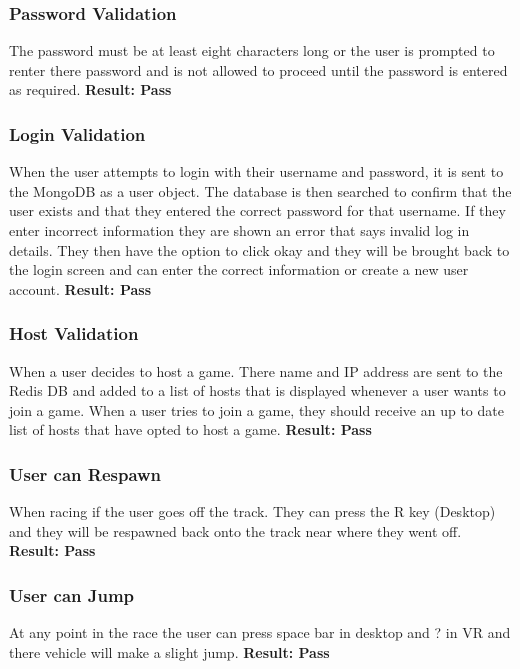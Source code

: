\subsubsection{Password Validation}  \newline
The password must be at least eight characters long or the user is prompted to renter  there password and is not allowed to proceed until the password is entered as required.\newline
\textbf{Result: Pass}

\subsubsection{Login Validation}  \newline
When the user attempts to login with their username and password, it is sent to the MongoDB as a user object. The database is then searched to confirm that the user exists and that they entered the correct password for that username. If they enter incorrect information they are shown an error that says invalid log in details. They then have the option to click okay and they will be brought back to the login screen and can enter the correct information or create a new user account.\newline 
\textbf{Result: Pass}

\subsubsection{Host Validation}\newline
When a user decides to host a game. There name and IP address are sent to the Redis DB and added to a list of hosts that is displayed whenever a user wants to join a game. When a user tries to join a game, they should receive an up to date list of hosts that have opted to host a game.\newline
\textbf{Result: Pass}

\subsubsection{User can Respawn}\newline
When racing if the user goes off the track. They can press the R key (Desktop) and they will be respawned back onto the track near where they went off. \newline 
\textbf{Result: Pass}

\subsubsection{User can Jump}\newline
At any point in the race the user can press space bar in desktop and ? in VR and there vehicle will make a slight jump. \newline 
\textbf{Result: Pass}

